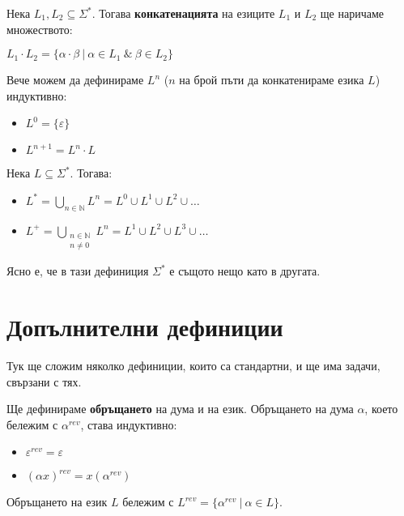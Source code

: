 \begin{definition}
    Нека $L_1, L_2 \subseteq \Sigma^*$.
    Тогава \textbf{конкатенацията} на езиците $L_1$ и $L_2$ ще наричаме множеството:
    \begin{center}
        $L_1 \cdot L_2 = \{ \alpha \cdot \beta \: | \: \alpha \in L_1 \: \& \: \beta \in L_2 \}$ \\
    \end{center}
\end{definition}

Вече можем да дефинираме $L^n$ ($n$ на брой пъти да конкатенираме езика $L$) индуктивно:
\begin{itemize}
    \item $L^0 = \{ \varepsilon \}$
    \item $L^{n + 1} = L^n \cdot L$
\end{itemize}

\begin{definition}
    Нека $L \subseteq \Sigma^*$. Тогава:
    \begin{itemize}
        \item $L^* = \bigcup\limits_{n \in \mathbb{N}} L^n = L^0 \cup L^1 \cup L^2 \cup \dots $
        \item $L^+ = \bigcup\limits_{\substack{n \in \mathbb{N} \\ n \neq 0}} L^n = L^1 \cup L^2 \cup L^3 \cup \dots $
    \end{itemize}
\end{definition}

Ясно е, че в тази дефиниция $\Sigma^*$ е същото нещо като в другата.

\section{Допълнителни дефиниции}

Тук ще сложим няколко дефиниции, които са стандартни, и ще има задачи, свързани с тях.

\begin{definition}
    Ще дефинираме \textbf{обръщането} на дума и на език.
    Обръщането на дума $\alpha$, което бележим с $\alpha^{rev}$, става индуктивно:
    \begin{itemize}
        \item $\varepsilon^{rev} = \varepsilon$
        \item $(\alpha x)^{rev} = x(\alpha^{rev})$
    \end{itemize}
    Обръщането на език $L$ бележим с $L^{rev} = \{\alpha^{rev} \: | \: \alpha \in L \}$.
\end{definition}

